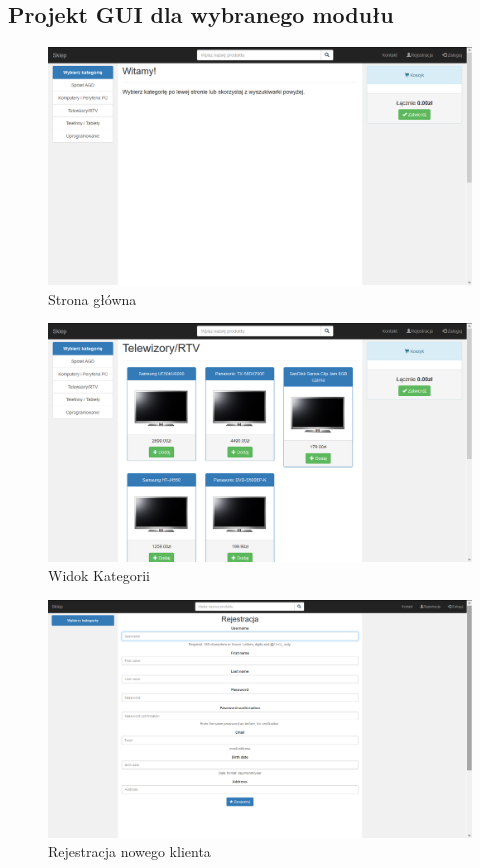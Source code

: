 \documentclass[10pt,a4paper]{article}
\begin{document}
\begin{itemize}
\begin{landscape}
   		\subsection{Projekt GUI dla wybranego modułu}
	    \begin{figure}[H]
   	 	\caption{Strona główna}
	    \centering
   		\includegraphics[scale=0.6]{mainpage}
   		\end{figure}
   		
   		\newpage
	    \begin{figure}[H]
   		\caption{Widok Kategorii}
		\centering
   		\includegraphics[scale=0.6]{categories}
   		\end{figure}
   		
   		\newpage
   		\begin{figure}[H]
   		\caption{Rejestracja nowego klienta}
   		\centering
   		\includegraphics[scale=0.6]{register}
   		\end{figure}
   		

\end{landscape}
\end{itemize}
\end{document}
